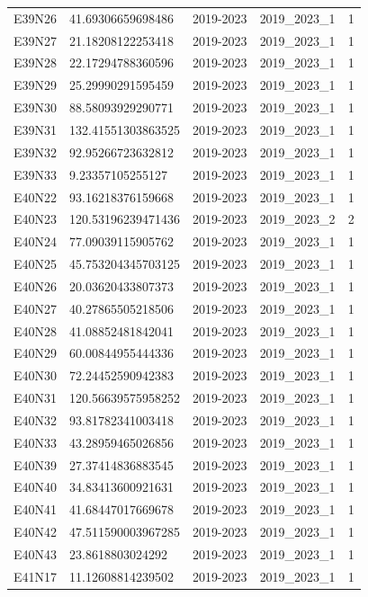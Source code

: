 \begin{landscape}
\begin{longtable}{lllll}
E39N26 & 41.69306659698486 & 2019-2023 & 2019\_2023\_1 & 1 \\
E39N27 & 21.18208122253418 & 2019-2023 & 2019\_2023\_1 & 1 \\
E39N28 & 22.17294788360596 & 2019-2023 & 2019\_2023\_1 & 1 \\
E39N29 & 25.29990291595459 & 2019-2023 & 2019\_2023\_1 & 1 \\
E39N30 & 88.58093929290771 & 2019-2023 & 2019\_2023\_1 & 1 \\
E39N31 & 132.41551303863525 & 2019-2023 & 2019\_2023\_1 & 1 \\
E39N32 & 92.95266723632812 & 2019-2023 & 2019\_2023\_1 & 1 \\
E39N33 & 9.23357105255127 & 2019-2023 & 2019\_2023\_1 & 1 \\
E40N22 & 93.16218376159668 & 2019-2023 & 2019\_2023\_1 & 1 \\
E40N23 & 120.53196239471436 & 2019-2023 & 2019\_2023\_2 & 2 \\
E40N24 & 77.09039115905762 & 2019-2023 & 2019\_2023\_1 & 1 \\
E40N25 & 45.753204345703125 & 2019-2023 & 2019\_2023\_1 & 1 \\
E40N26 & 20.03620433807373 & 2019-2023 & 2019\_2023\_1 & 1 \\
E40N27 & 40.27865505218506 & 2019-2023 & 2019\_2023\_1 & 1 \\
E40N28 & 41.08852481842041 & 2019-2023 & 2019\_2023\_1 & 1 \\
E40N29 & 60.00844955444336 & 2019-2023 & 2019\_2023\_1 & 1 \\
E40N30 & 72.24452590942383 & 2019-2023 & 2019\_2023\_1 & 1 \\
E40N31 & 120.56639575958252 & 2019-2023 & 2019\_2023\_1 & 1 \\
E40N32 & 93.81782341003418 & 2019-2023 & 2019\_2023\_1 & 1 \\
E40N33 & 43.28959465026856 & 2019-2023 & 2019\_2023\_1 & 1 \\
E40N39 & 27.37414836883545 & 2019-2023 & 2019\_2023\_1 & 1 \\
E40N40 & 34.83413600921631 & 2019-2023 & 2019\_2023\_1 & 1 \\
E40N41 & 41.68447017669678 & 2019-2023 & 2019\_2023\_1 & 1 \\
E40N42 & 47.511590003967285 & 2019-2023 & 2019\_2023\_1 & 1 \\
E40N43 & 23.8618803024292 & 2019-2023 & 2019\_2023\_1 & 1 \\
E41N17 & 11.12608814239502 & 2019-2023 & 2019\_2023\_1 & 1 \\

\end{longtable}
\end{landscape}
